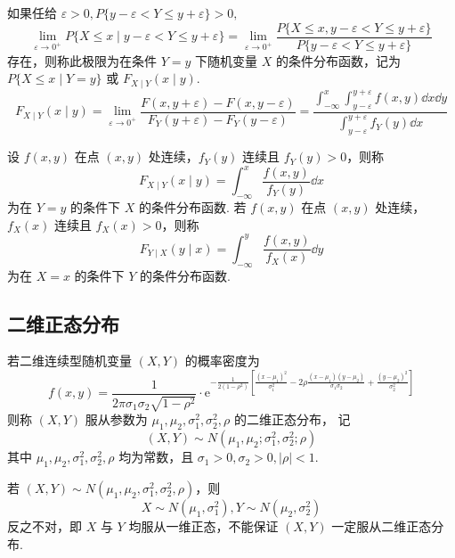\begin{definition}[二维随机变量条件分布函数 A]
    如果任给 $ \varepsilon>0, P\{y-\varepsilon<Y \leqslant y+\varepsilon\}>0 ,$
    $$\lim _{\varepsilon \rightarrow 0^{+}} P\{X \leqslant x \mid y-\varepsilon<Y \leqslant y+\varepsilon\}=\lim _{\varepsilon \rightarrow 0^{+}} \frac{P\{X \leqslant x, y-\varepsilon<Y \leqslant y+\varepsilon\}}{P\{y-\varepsilon<Y \leqslant y+\varepsilon\}}$$
    存在，则称此极限为在条件 $ Y=y $ 下随机变量 $ X $ 的条件分布函数，记为 $ P\{X \leqslant x \mid Y=y\} $ 或 $ F_{X \mid Y}(x \mid y) $.
    $$F_{X \mid Y}(x \mid y)=\lim _{\varepsilon \rightarrow 0^{+}} \frac{F(x, y+\varepsilon)-F(x, y-\varepsilon)}{F_{Y}(y+\varepsilon)-F_{Y}(y-\varepsilon)}
    =\frac{\displaystyle\int_{-\infty}^{x} \int_{y-\varepsilon}^{y+\varepsilon} f(x, y) \dd  x \dd  y}{\displaystyle \int_{y-\varepsilon}^{y+\varepsilon} f_{Y}(y) \dd  x}$$
\end{definition}

\begin{definition}[二维随机变量条件分布函数 B]
    设 $ f(x, y) $ 在点 $ (x, y) $ 处连续，$f_{Y}(y) $ 连续且 $ f_{Y}(y)>0 $，则称
    $$F_{X \mid Y}(x \mid y)=\int_{-\infty}^{x} \frac{f(x, y)}{f_{Y}(y)} \dd  x$$
    为在 $ Y=y $ 的条件下 $ X $ 的条件分布函数.
    若 $ f(x, y) $ 在点 $ (x, y) $ 处连续，$f_{X}(x) $ 连续且 $ f_{X}(x)>0 $，则称
    $$F_{Y \mid X}(y \mid x)=\int_{-\infty}^{y} \frac{f(x, y)}{f_{X}(x)} \dd  y$$
    为在 $ X=x $ 的条件下 $ Y $ 的条件分布函数.
\end{definition}

\subsection{二维正态分布}

\begin{definition}[二维正态分布]
    若二维连续型随机变量 $ (X, Y) $ 的概率密度为
    $$f(x,y)=\frac{1}{2 \pi \sigma_{1} \sigma_{2} \sqrt{1-\rho^{2}}} \cdot \mathrm{e}^{-\frac{1}{2\left(1-\rho^{2}\right)}\left[\frac{\left(x-\mu_{1}\right)^{2}}{\sigma_{1}^{2}}-2 \rho \frac{\left(x-\mu_{1}\right)\left(y-\mu_{2}\right)}{\sigma_{1} \sigma_{2}}+\frac{\left(y-\mu_{2}\right)^{2}}{\sigma_{2}^{2}}\right]}$$
    则称 $ (X, Y) $ 服从参数为 $ \mu_{1}, \mu_{2}, \sigma_{1}^{2}, \sigma_{2}^{2}, \rho $ 的二维正态分布，
    记 $$ (X, Y) \sim N\left(\mu_{1}, \mu_{2}; \sigma_{1}^{2}, \sigma_{2}^{2}; \rho\right) $$
    其中 $ \mu_{1}, \mu_{2}, \sigma_{1}^{2}, \sigma_{2}^{2}, \rho $ 均为常数，且 $ \sigma_{1}>0, \sigma_{2}>0,|\rho|<1 .$
\end{definition}
\begin{theorem}[二维正态分布推出一维正态分布]
    若 $ (X, Y) \sim N\left(\mu_{1}, \mu_{2}, \sigma_{1}^{2}, \sigma_{2}^{2}, \rho\right) $，则
    $$X \sim N\left(\mu_{1}, \sigma_{1}^{2}\right), Y \sim N\left(\mu_{2}, \sigma_{2}^{2}\right)$$
    反之不对，即 $ X $ 与 $ Y $ 均服从一维正态，不能保证 $ (X, Y) $ 一定服从二维正态分布.
\end{theorem}

